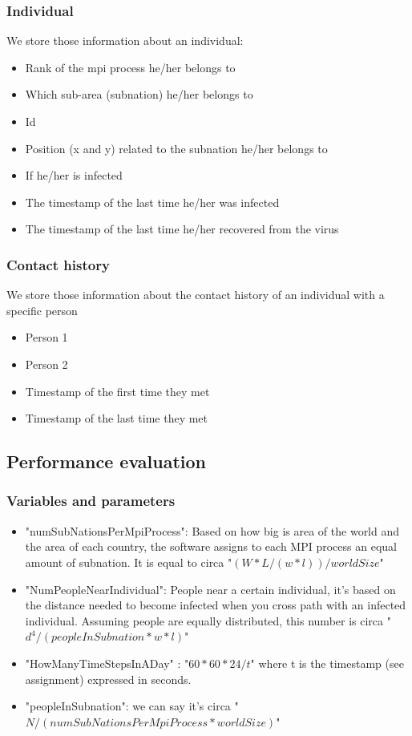 \documentclass[table, 12pt]{article}
\begin{document}
\subsubsection{Individual}
We store those information about an individual: 
\begin{itemize}
\setlength\itemsep{-0.5em}
\item Rank of the mpi process he/her belongs to
\item Which sub-area (subnation) he/her belongs to
\item Id
\item Position (x and y) related to the subnation he/her belongs to 
\item If he/her is infected
\item The timestamp of the last time he/her was infected
\item The timestamp of the last time he/her recovered from the virus
\end{itemize}

\subsubsection{Contact history}
We store those information about the contact history of an individual with a specific person
\begin{itemize}
\setlength\itemsep{-0.5em}
\item Person 1
\item Person 2
\item Timestamp of the first time they met
\item Timestamp of the last time they met
\end{itemize}

\subsection{Performance evaluation}

\subsubsection{Variables and parameters}
\begin{flushleft}
\begin{itemize}
\setlength\itemsep{-0.5em}
\item "numSubNationsPerMpiProcess": Based on how big is area of the world and the area of each country, the software assigns to each MPI process an equal amount of subnation. It is equal to circa "$ (W*L/(w*l)) / worldSize $"
\item "NumPeopleNearIndividual": People near a certain individual, it's based on the distance needed to become infected when you cross path with an infected individual. Assuming people are equally distributed, this number is circa "$ d^4 / (peopleInSubnation * w*l) $"
\item "HowManyTimeStepsInADay" : "$ 60 * 60 * 24 / t $" where t is the timestamp (see assignment) expressed in seconds.
\item "peopleInSubnation": we can say it's circa "$ N/(numSubNationsPerMpiProcess * worldSize) $"
\end{itemize}
\end{flushleft}
\end{document}
